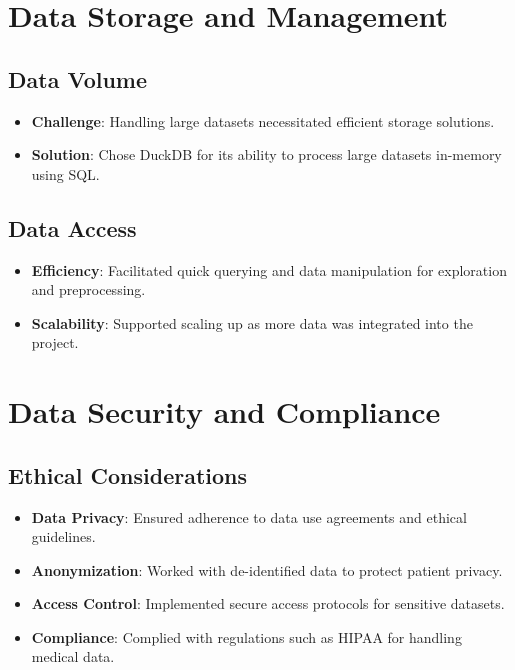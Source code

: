 \documentclass[12pt,a4paper]{report}
\begin{document}
\section{Data Storage and Management}

\subsection{Data Volume}
\begin{itemize}
    \item \textbf{Challenge}: Handling large datasets necessitated efficient storage solutions.
    \item \textbf{Solution}: Chose DuckDB for its ability to process large datasets in-memory using SQL.
\end{itemize}

\subsection{Data Access}
\begin{itemize}
    \item \textbf{Efficiency}: Facilitated quick querying and data manipulation for exploration and preprocessing.
    \item \textbf{Scalability}: Supported scaling up as more data was integrated into the project.
\end{itemize}

\section{Data Security and Compliance}

\subsection{Ethical Considerations}
\begin{itemize}
    \item \textbf{Data Privacy}: Ensured adherence to data use agreements and ethical guidelines.
    \item \textbf{Anonymization}: Worked with de-identified data to protect patient privacy.
    \item \textbf{Access Control}: Implemented secure access protocols for sensitive datasets.
    \item \textbf{Compliance}: Complied with regulations such as HIPAA for handling medical data.
\end{itemize}
\end{document}
